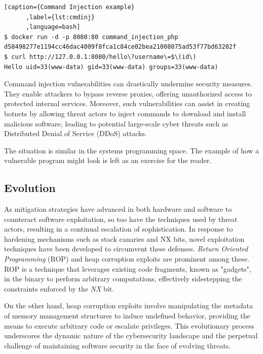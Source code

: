 \documentclass{article}
\begin{document}
\begin{lstlisting}[caption={Command Injection example}
      ,label={lst:cmdinj}
      ,language=bash]
$ docker run -d -p 8080:80 command_injection_php
d58498277e1194cc46dac4009f8fca1c84ce02bea21008075ad53f77bd63202f
$ curl http://127.0.0.1:8080/hello\?username\=$\(id\)
Hello uid=33(www-data) gid=33(www-data) groups=33(www-data)
\end{lstlisting}
Command injection vulnerabilities can drastically undermine security measures. They enable attackers to bypass reverse proxies, offering unauthorized access to protected internal services. Moreover, such vulnerabilities can assist in creating botnets by allowing threat actors to inject commands to download and install malicious software, leading to potential large-scale cyber threats such as Distributed Denial of Service (DDoS) attacks.

The situation is similar in the systems programming space. The example of how a vulnerable program might look is left as an exercise for the reader.

\subsection{Evolution}
As mitigation strategies have advanced in both hardware and software to counteract software exploitation, so too have the techniques used by threat actors, resulting in a continual escalation of sophistication. In response to hardening mechanisms such as stack canaries and NX bits, novel exploitation techniques have been developed to circumvent these defenses. \emph{Return Oriented Programming} (ROP) and heap corruption exploits are prominent among these. ROP is a technique that leverages existing code fragments, known as "gadgets", in the binary to perform arbitrary computations, effectively sidestepping the constraints enforced by the \emph{NX} bit. 

On the other hand, heap corruption exploits involve manipulating the metadata of memory management structures to induce undefined behavior, providing the means to execute arbitrary code or escalate privileges. This evolutionary process underscores the dynamic nature of the cybersecurity landscape and the perpetual challenge of maintaining software security in the face of evolving threats.
\end{document}
